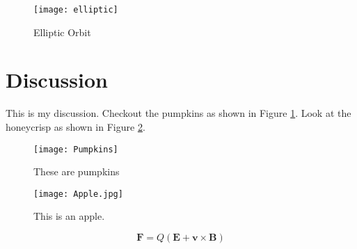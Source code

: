 \documentclass{article}
\begin{document}
\begin{figure}[h]
\begin{center}
\texttt{[image: elliptic]} %
\caption{Elliptic Orbit}
\end{center}
\end{figure}

\section{Discussion}
This is my discussion.  Checkout the pumpkins as shown in Figure \ref{fig:pumpkin}.  Look at the honeycrisp as shown in Figure \ref{fig:apple}.


\begin{figure}[h]
\begin{center}
\texttt{[image: Pumpkins]} %
\caption{These are pumpkins}
 \label{fig:pumpkin}
\end{center}
\end{figure}

\begin{figure}[h]
\begin{center}
\texttt{[image: Apple.jpg]} %
\caption{This is an apple.}
 \label{fig:apple}
\end{center}
\end{figure}

$$\mathbf{F} = Q (\mathbf{E} + \mathbf{v} \times \mathbf{B})$$









\end{document}
